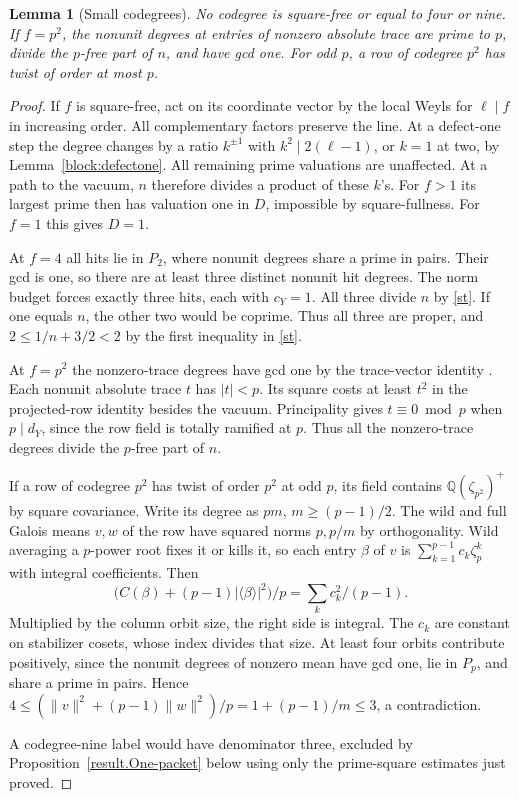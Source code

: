 \documentclass[11pt]{amsart}
\numberwithin{equation}{section}
\newtheorem{lemma}[theorem]{Lemma}
\theoremstyle{definition}
\theoremstyle{plain}
\newcommand{\QQ}{\mathbb Q}
\begin{document}
\begin{lemma}[Small codegrees]\label{result:squarefree-codegree}
No codegree is square-free or equal to four or nine. If $f=p^2$,
the nonunit degrees at entries of nonzero absolute trace are prime
to $p$, divide the $p$-free part of $n$, and have gcd one.
For odd $p$, a row of codegree $p^2$ has twist of order at most $p$.
\end{lemma}
\begin{proof}
If $f$ is square-free, act on its coordinate vector by the local
Weyls for $\ell\mid f$ in increasing order. All complementary
factors preserve the line. At a defect-one step the degree changes
by a ratio $k^{\pm1}$ with $k^2\mid2(\ell-1)$, or $k=1$ at two,
by Lemma~\ref{block:defectone}. All remaining prime valuations are
unaffected. At a path to the vacuum, $n$ therefore divides a product
of these $k$'s. For $f>1$ its largest prime then has valuation one
in $D$, impossible by square-fullness. For $f=1$ this gives $D=1$.

At $f=4$ all hits lie in $P_2$, where nonunit degrees share a prime
in pairs. Their gcd is one, so there are at least three distinct
nonunit hit degrees. The norm budget forces exactly three hits,
each with $c_Y=1$. All three divide $n$ by \eqref{st}. If one
equals $n$, the other two would be coprime. Thus all three are
proper, and $2\le1/n+3/2<2$ by the first inequality in \eqref{st}.

At $f=p^2$ the nonzero-trace degrees have gcd one by the
trace-vector identity \cite[Proposition~5.4]{BDPcore}. Each
nonunit absolute trace $t$ has $|t|<p$. Its square costs at least
$t^2$ in the projected-row identity \cite[(2.4)]{BDPcore} besides
the vacuum. Principality gives $t\equiv0\bmod p$ when $p\mid d_Y$,
since the row field is totally ramified at $p$. Thus all the
nonzero-trace degrees divide the $p$-free part of $n$.

If a row of codegree $p^2$ has twist of order $p^2$ at odd $p$,
its field contains $\QQ(\zeta_{p^2})^+$ by square covariance.
Write its degree as $pm$, $m\ge(p-1)/2$. The wild and full Galois
means $v,w$ of the row have squared norms $p,p/m$ by orthogonality.
Wild averaging a $p$-power
root fixes it or kills it, so each entry $\beta$ of $v$ is
$\sum_{k=1}^{p-1}c_k\zeta_p^k$ with integral coefficients. Then
\[
 \bigl(C(\beta)+(p-1)|\langle\beta\rangle|^2\bigr)/p
       =\sum_k c_k^2/(p-1).
\]
Multiplied by the column orbit size, the right side is integral.
The $c_k$ are constant on stabilizer cosets, whose index divides
that size. At least four orbits contribute positively, since the
nonunit degrees of nonzero mean have gcd one, lie in $P_p$, and
share a prime in pairs. Hence $4\le (\|v\|^2+(p-1)\|w\|^2)/p=1+(p-1)/m\le3$,
a contradiction.

A codegree-nine label would have denominator three, excluded
by Proposition~\ref{result.One-packet} below using only the prime-square
estimates just proved.
\end{proof}
\end{document}
